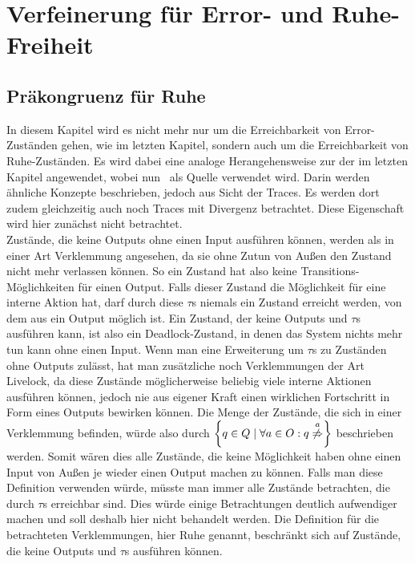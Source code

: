 \chapter{Verfeinerung für Error- und Ruhe-Freiheit}

\section{Präkongruenz für Ruhe}

In diesem Kapitel wird es nicht mehr nur um die Erreichbarkeit von
Error-Zuständen gehen, wie im letzten Kapitel, sondern auch um die Erreichbarkeit von
Ruhe-Zuständen. Es wird dabei eine analoge Herangehensweise zur der im letzten
Kapitel angewendet, wobei nun~\cite{Chilton2013} als Quelle verwendet wird. Darin
werden ähnliche Konzepte beschrieben, jedoch aus Sicht der Traces. Es werden
dort zudem gleichzeitig auch noch Traces mit Divergenz betrachtet. Diese
Eigenschaft wird hier zunächst nicht betrachtet.\\
Zustände, die keine Outputs ohne einen Input ausführen können, werden als
in einer Art Verklemmung angesehen, da sie ohne Zutun von Außen den Zustand
nicht mehr verlassen können. So ein Zustand hat also keine
Transitions-Möglichkeiten für einen Output. Falls dieser Zustand
die Möglichkeit für eine interne Aktion hat, darf durch diese $\tau$s niemals ein Zustand
erreicht werden, von dem aus ein Output möglich ist. Ein Zustand, der keine
Outputs und $\tau$s ausführen kann, ist also ein Deadlock-Zustand, in denen das
System nichts mehr tun kann ohne einen Input. Wenn man eine Erweiterung um
$\tau$s zu Zuständen ohne Outputs zulässt, hat man zusätzliche noch
Verklemmungen der Art Livelock, da diese Zustände möglicherweise beliebig viele
interne Aktionen ausführen können, jedoch nie aus eigener Kraft einen
wirklichen Fortschritt in Form eines Outputs bewirken können. Die Menge der
Zustände, die sich in einer Verklemmung befinden, würde also durch $\left\{q\in
Q\mid \forall a\in O: q \overset{a}{\not{\hspace{-0.1cm}\Rightarrow}}\right\}$
beschrieben werden. Somit wären dies alle Zustände, die keine Möglichkeit haben
ohne einen Input von Außen je wieder einen Output machen zu können. Falls man
diese Definition verwenden würde, müsste man immer alle Zustände betrachten,
die durch $\tau$s erreichbar sind. Dies würde einige Betrachtungen deutlich
aufwendiger machen und soll deshalb hier nicht behandelt werden. Die Definition
für die betrachteten Verklemmungen, hier Ruhe genannt, beschränkt sich auf
Zustände, die keine Outputs und $\tau$s ausführen können.

